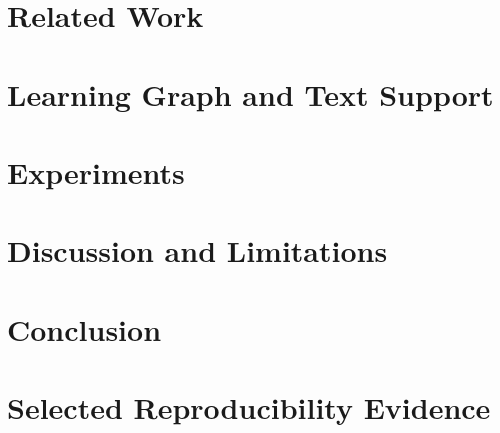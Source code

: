 \documentclass[sigconf,anonymous,review]{acmart}
\begin{document}
\section{Related Work}


\section{Learning Graph and Text Support}


\section{Experiments}
\label{sec:setup}






\section{Discussion and Limitations}


\section{Conclusion}


\clearpage



\appendix
\section{Selected Reproducibility Evidence}
\label{app:compact}

\end{document}
